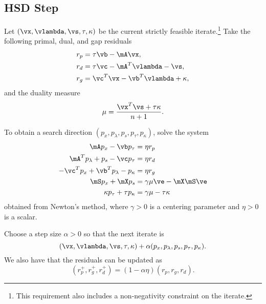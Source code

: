 \documentclass[titlepage]{abhi-tufte-handout}
\begin{document}
\subsection{HSD Step}\label{sec:hsd-step}
Let \((\vx, \vlambda, \vs, \tau, \kappa)\) be the current strictly
feasible iterate.\footnote{%
This requirement also includes a non-negativity constraint on the
iterate.%
}
Take the following primal, dual, and gap residuals
\begin{subequations}
\begin{align*}
    r_p & = \tau \vb - \mA \vx, \\
    r_d & = \tau \vc - \mA^T \vlambda - \vs, \\
    r_g & = \vc^T \vx - \vb^T \vlambda + \kappa,
\end{align*}
\end{subequations}
and the duality measure
\[ \mu = \frac{\vx^T \vs + \tau\kappa}{n + 1}. \]

To obtain a search direction
\((p_x, p_{\lambda}, p_s, p_{\tau}, p_{\kappa})\),
solve the system
\begin{subequations}
\begin{align*}
    \mA p_x - \vb p_{\tau} & = \eta r_p \\
    \mA^T p_{\lambda} + p_s - \vc p_{\tau} & = \eta r_d \\
    -\vc^T p_x + \vb^T p_{\lambda} - p_{\kappa} & = \eta r_g \\
    \mS p_x + \mX p_s & = \gamma\mu\ve - \mX\mS\ve\\
    \kappa p_{\tau} + \tau p_{\kappa} & = \gamma \mu -\tau \kappa
\end{align*}
\end{subequations}
obtained from Newton's method, where \(\gamma > 0\) is a centering parameter
and \(\eta > 0\) is a scalar.

Choose a step size \(\alpha > 0\) so that the next iterate is
\[ (\vx, \vlambda, \vs, \tau, \kappa) + \alpha
(p_x, p_{\lambda}, p_s, p_{\tau}, p_{\kappa}). \]
We also have that the residuals can be updated as
\begin{equation}\label{eq:residual}
(r_p^+, r_g^+, r_d^+) = (1 - \alpha \eta)(r_p, r_g, r_d).
\end{equation}
\end{document}
